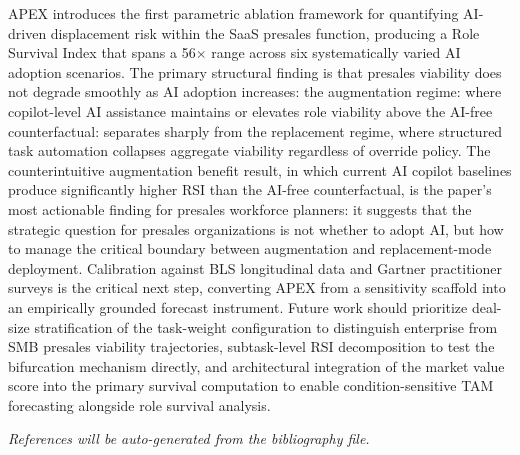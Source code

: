 \documentclass[10pt, conference]{IEEEtran}
\begin{document}
APEX introduces the first parametric ablation framework for quantifying AI-driven displacement risk within the SaaS presales function, producing a Role Survival Index that spans a 56$\times$ range across six systematically varied AI adoption scenarios. The primary structural finding is that presales viability does not degrade smoothly as AI adoption increases: the augmentation regime: where copilot-level AI assistance maintains or elevates role viability above the AI-free counterfactual: separates sharply from the replacement regime, where structured task automation collapses aggregate viability regardless of override policy. The counterintuitive augmentation benefit result, in which current AI copilot baselines produce significantly higher RSI than the AI-free counterfactual, is the paper's most actionable finding for presales workforce planners: it suggests that the strategic question for presales organizations is not whether to adopt AI, but how to manage the critical boundary between augmentation and replacement-mode deployment. Calibration against BLS longitudinal data and Gartner practitioner surveys is the critical next step, converting APEX from a sensitivity scaffold into an empirically grounded forecast instrument. Future work should prioritize deal-size stratification of the task-weight configuration to distinguish enterprise from SMB presales viability trajectories, subtask-level RSI decomposition to test the bifurcation mechanism directly, and architectural integration of the market value score into the primary survival computation to enable condition-sensitive TAM forecasting alongside role survival analysis.

\textit{References will be auto-generated from the bibliography file.}



\end{document}
